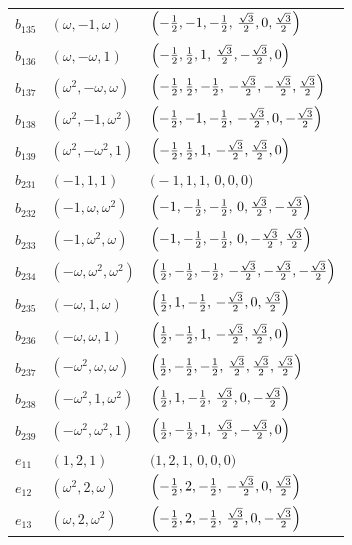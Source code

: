 \documentclass[%
  reprint,
  superscriptaddress,
  amsmath,amssymb,
  pra,
  floatfix,
  longbibliography
]{revtex4-2}
\begin{document}
\begin{longtable}{lll}
$b_{135}$ & $(\omega,-1,\omega)$ &
$\Bigl(-\tfrac12,-1,-\tfrac12,\,\tfrac{\sqrt{3}}{2},0,\tfrac{\sqrt{3}}{2}\Bigr)$ \\
$b_{136}$ & $(\omega,-\omega,1)$ &
$\Bigl(-\tfrac12,\tfrac12,1,\,\tfrac{\sqrt{3}}{2},-\tfrac{\sqrt{3}}{2},0\Bigr)$ \\
$b_{137}$ & $(\omega^2,-\omega,\omega)$ &
$\Bigl(-\tfrac12,\tfrac12,-\tfrac12,\,-\tfrac{\sqrt{3}}{2},-\tfrac{\sqrt{3}}{2},\tfrac{\sqrt{3}}{2}\Bigr)$ \\
$b_{138}$ & $(\omega^2,-1,\omega^2)$ &
$\Bigl(-\tfrac12,-1,-\tfrac12,\,-\tfrac{\sqrt{3}}{2},0,-\tfrac{\sqrt{3}}{2}\Bigr)$ \\
$b_{139}$ & $(\omega^2,-\omega^2,1)$ &
$\Bigl(-\tfrac12,\tfrac12,1,\,-\tfrac{\sqrt{3}}{2},\tfrac{\sqrt{3}}{2},0\Bigr)$ \\
$b_{231}$ & $(-1,1,1)$ &
$\bigl(-1,1,1,\,0,0,0\bigr)$ \\
$b_{232}$ & $(-1,\omega,\omega^2)$ &
$\Bigl(-1,-\tfrac12,-\tfrac12,\,0,\tfrac{\sqrt{3}}{2},-\tfrac{\sqrt{3}}{2}\Bigr)$ \\
$b_{233}$ & $(-1,\omega^2,\omega)$ &
$\Bigl(-1,-\tfrac12,-\tfrac12,\,0,-\tfrac{\sqrt{3}}{2},\tfrac{\sqrt{3}}{2}\Bigr)$ \\
$b_{234}$ & $(-\omega,\omega^2,\omega^2)$ &
$\Bigl(\tfrac12,-\tfrac12,-\tfrac12,\,-\tfrac{\sqrt{3}}{2},-\tfrac{\sqrt{3}}{2},-\tfrac{\sqrt{3}}{2}\Bigr)$ \\
$b_{235}$ & $(-\omega,1,\omega)$ &
$\Bigl(\tfrac12,1,-\tfrac12,\,-\tfrac{\sqrt{3}}{2},0,\tfrac{\sqrt{3}}{2}\Bigr)$ \\
$b_{236}$ & $(-\omega,\omega,1)$ &
$\Bigl(\tfrac12,-\tfrac12,1,\,-\tfrac{\sqrt{3}}{2},\tfrac{\sqrt{3}}{2},0\Bigr)$ \\
$b_{237}$ & $(-\omega^2,\omega,\omega)$ &
$\Bigl(\tfrac12,-\tfrac12,-\tfrac12,\,\tfrac{\sqrt{3}}{2},\tfrac{\sqrt{3}}{2},\tfrac{\sqrt{3}}{2}\Bigr)$ \\
$b_{238}$ & $(-\omega^2,1,\omega^2)$ &
$\Bigl(\tfrac12,1,-\tfrac12,\,\tfrac{\sqrt{3}}{2},0,-\tfrac{\sqrt{3}}{2}\Bigr)$ \\
$b_{239}$ & $(-\omega^2,\omega^2,1)$ &
$\Bigl(\tfrac12,-\tfrac12,1,\,\tfrac{\sqrt{3}}{2},-\tfrac{\sqrt{3}}{2},0\Bigr)$ \\
$e_{11}$ & $(1,2,1)$ &
$\bigl(1,2,1,\,0,0,0\bigr)$ \\
$e_{12}$ & $(\omega^2,2,\omega)$ &
$\Bigl(-\tfrac12,2,-\tfrac12,\,-\tfrac{\sqrt{3}}{2},0,\tfrac{\sqrt{3}}{2}\Bigr)$ \\
$e_{13}$ & $(\omega,2,\omega^2)$ &
$\Bigl(-\tfrac12,2,-\tfrac12,\,\tfrac{\sqrt{3}}{2},0,-\tfrac{\sqrt{3}}{2}\Bigr)$ \\

\end{longtable}
\end{document}
